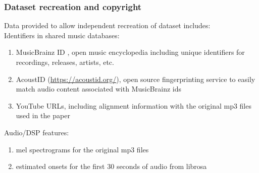 \documentclass{beamer}
\begin{document}
\begin{frame}
	\frametitle{Dataset recreation and copyright}
	Data provided to allow independent recreation of dataset includes:\\
	Identifiers in shared music databases:
	\begin{enumerate}
		\item
			MusicBrainz ID , open music encyclopedia including unique identifiers for recordings, releases, artists, etc.
		\item
			AcoustID (\href{https://acoustid.org/}{https://acoustid.org/}), open source fingerprinting service to easily match audio content associated with MusicBrainz ids
		\item
			YouTube URLs, including alignment information with the original mp3 files used in the paper
	\end{enumerate}
	Audio/DSP features:
	\begin{enumerate}
		\item
			mel spectrograms for the original mp3 files
		\item
			estimated onsets for the first 30 seconds of audio from librosa
	\end{enumerate}
\end{frame}

\end{document}
